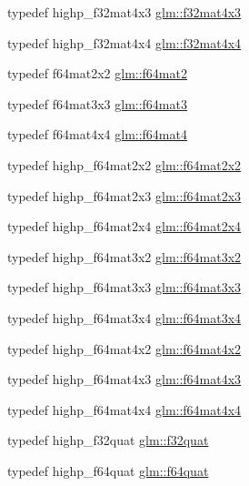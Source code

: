 \begin{DoxyCompactItemize}
\item 
typedef highp\-\_\-f32mat4x3 \hyperlink{group__gtc__type__precision_gad68d998fa74028e02bfadd4778bd549a}{glm\-::f32mat4x3}
\item 
typedef highp\-\_\-f32mat4x4 \hyperlink{group__gtc__type__precision_gac4a4b2671cbf50ab95c55fce2bfcd811}{glm\-::f32mat4x4}
\item 
typedef f64mat2x2 \hyperlink{group__gtc__type__precision_gaf66aa8b74ef627da80162c17a74a04fe}{glm\-::f64mat2}
\item 
typedef f64mat3x3 \hyperlink{group__gtc__type__precision_ga44f23eb3c2e893d0afb1aa2b9e89be76}{glm\-::f64mat3}
\item 
typedef f64mat4x4 \hyperlink{group__gtc__type__precision_ga5bfcfa195cfe908fe50ecc15abbf7979}{glm\-::f64mat4}
\item 
typedef highp\-\_\-f64mat2x2 \hyperlink{group__gtc__type__precision_ga1e14d8b4e18898be51cd719fda213dcc}{glm\-::f64mat2x2}
\item 
typedef highp\-\_\-f64mat2x3 \hyperlink{group__gtc__type__precision_ga6d0196bded514d55e26e0f68dd38b37b}{glm\-::f64mat2x3}
\item 
typedef highp\-\_\-f64mat2x4 \hyperlink{group__gtc__type__precision_gaf18b9f693f2ef743d93c9afd5cfbe229}{glm\-::f64mat2x4}
\item 
typedef highp\-\_\-f64mat3x2 \hyperlink{group__gtc__type__precision_ga0039ae03558b5242466f4c344c3c7d65}{glm\-::f64mat3x2}
\item 
typedef highp\-\_\-f64mat3x3 \hyperlink{group__gtc__type__precision_gab272e67eb87cc1e8233237480c2aa8d2}{glm\-::f64mat3x3}
\item 
typedef highp\-\_\-f64mat3x4 \hyperlink{group__gtc__type__precision_ga36436dae85fc187d4a20d68c4d660a10}{glm\-::f64mat3x4}
\item 
typedef highp\-\_\-f64mat4x2 \hyperlink{group__gtc__type__precision_ga13dbaf75e4f1b18c35d2837067a14ce9}{glm\-::f64mat4x2}
\item 
typedef highp\-\_\-f64mat4x3 \hyperlink{group__gtc__type__precision_gab10a195a85f65da47bf70438f57a8a3c}{glm\-::f64mat4x3}
\item 
typedef highp\-\_\-f64mat4x4 \hyperlink{group__gtc__type__precision_ga6b1ada50de2fc7d991138ab857fb2476}{glm\-::f64mat4x4}
\item 
typedef highp\-\_\-f32quat \hyperlink{group__gtc__type__precision_gac59c4d798396552e4bbb866b3d8a2f18}{glm\-::f32quat}
\item 
typedef highp\-\_\-f64quat \hyperlink{group__gtc__type__precision_ga5b54d7b36fbee5e271f73e6ed74e7172}{glm\-::f64quat}
\end{DoxyCompactItemize}


